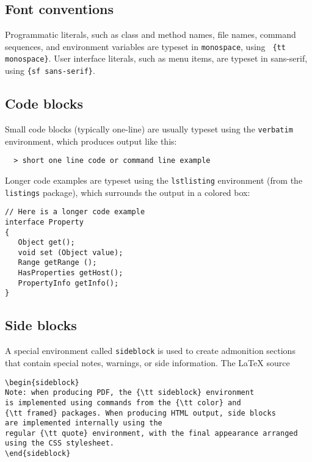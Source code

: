 \documentclass{article}
\begin{document}
\subsection{Font conventions}

Programmatic literals, such as class and method names, file names, 
command sequences, and
environment variables are typeset in {\tt monospace}, using {\tt
\{\BKS tt monospace\}}. User interface literals, such as menu items, are
typeset in {\sf sans-serif}, using {\tt \{\BKS sf sans-serif\}}.

\subsection{Code blocks}

Small code blocks (typically one-line) are usually typeset using the
{\tt verbatim} environment, which produces output like this:

\begin{verbatim}
  > short one line code or command line example
\end{verbatim}

Longer code examples are typeset using the {\tt lstlisting}
environment (from the {\tt listings} package), which surrounds
the output in a colored box:

\begin{lstlisting}[]
// Here is a longer code example
interface Property
{
   Object get(); 
   void set (Object value); 
   Range getRange ();
   HasProperties getHost();
   PropertyInfo getInfo();
}
\end{lstlisting}

\subsection{Side blocks}
\label{SideBlocksSec}

A special environment called {\tt sideblock} is used to create
admonition sections that contain special notes, warnings, or side
information. The LaTeX source

\begin{lstlisting}[]
\begin{sideblock}
Note: when producing PDF, the {\tt sideblock} environment
is implemented using commands from the {\tt color} and
{\tt framed} packages. When producing HTML output, side blocks
are implemented internally using the
regular {\tt quote} environment, with the final appearance arranged
using the CSS stylesheet. 
\end{sideblock}
\end{lstlisting}
\end{document}
